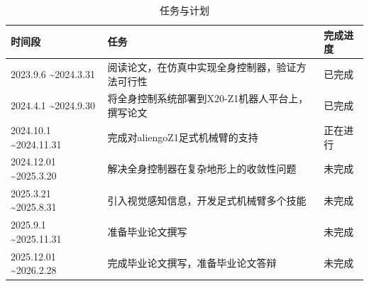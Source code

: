 \begin{table}[H]
    \fangsong
    \caption{任务与计划}
    \centering
    {
        \begin{tabularx}{\textwidth}{|X|X|X|} \hline
            \textbf{时间段}                         & \textbf{任务}                 & \textbf{完成进度} \\ \hline
            2023.9.6 \textasciitilde 2024.3.31   & 阅读论文，在仿真中实现全身控制器，验证方法可行性    & 已完成           \\ \hline
            2024.4.1 \textasciitilde 2024.9.30   & 将全身控制系统部署到X20-Z1机器人平台上，撰写论文 & 已完成           \\ \hline
            2024.10.1 \textasciitilde 2024.11.31 & 完成对aliengoZ1足式机械臂的支持        & 正在进行          \\ \hline
            2024.12.01 \textasciitilde 2025.3.20 & 解决全身控制器在复杂地形上的收敛性问题         & 未完成           \\ \hline
            2025.3.21 \textasciitilde 2025.8.31  & 引入视觉感知信息，开发足式机械臂多个技能        & 未完成           \\ \hline
            2025.9.1 \textasciitilde 2025.11.31  & 准备毕业论文撰写                    & 未完成           \\ \hline
            2025.12.01 \textasciitilde 2026.2.28 & 完成毕业论文撰写，准备毕业论文答辩           & 未完成           \\ \hline
        \end{tabularx}
    }
    \label{Table.1}
\end{table}

\cleardoublepage
\begingroup
{}
\printbibliography[title={参考文献}]
\endgroup
